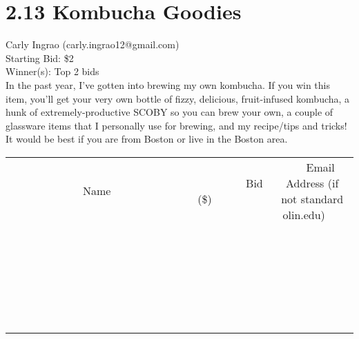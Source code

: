 \documentclass[11pt]{article}
\begin{document}
\section*{2.13 Kombucha Goodies}
Carly Ingrao (carly.ingrao12@gmail.com) \\
Starting Bid: \$2 \\
Winner(s): 
Top 2 bids \\
In the past year, I've gotten into brewing my own kombucha. If you win this item, you'll get your very own bottle of fizzy, delicious, fruit-infused kombucha, a hunk of extremely-productive SCOBY so you can brew your own, a couple of glassware items that I personally use for brewing, and my recipe/tips and tricks! It would be best if you are from Boston or live in the Boston area. \\[6ex]
\begin{tabular}{c c c}
~~~~~~~~~~~~~Name~~~~~~~~~~~~~ & ~~~~~~~~~Bid (\$)~~~~~~~~~ & ~~~Email Address (if not standard olin.edu)~~~ \\
 & & \\
\hline
 & & \\
\hline
 & & \\
\hline
 & & \\
\hline
 & & \\
\hline
 & & \\
\hline
 & & \\
\hline
 & & \\
\hline
 & & \\
\hline
 & & \\
\hline
 & & \\
\hline
 & & \\
\hline
 & & \\
\hline
 & & \\
\hline
 & & \\
\hline
 & & \\
\hline
 & & \\
\hline
 & & \\
\hline
 & & \\
\hline
 & & \\
\hline
 & & \\
\hline
 & & \\
\hline
 & & \\
\hline
 & & \\
\hline
 & & \\
\hline
 & & \\
\hline
\end{tabular}
\clearpage
\end{document}
